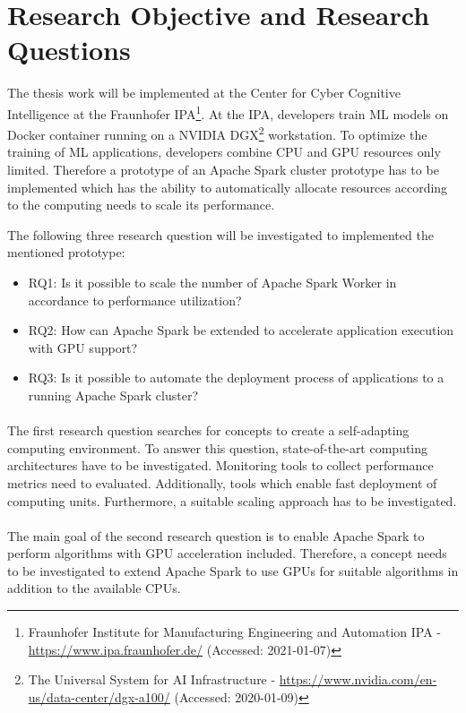 \section{Research Objective and Research Questions}
The thesis work will be implemented at the Center for Cyber Cognitive Intelligence at the Fraunhofer IPA\footnote{Fraunhofer Institute for Manufacturing Engineering and Automation IPA - \url{https://www.ipa.fraunhofer.de/} (Accessed: 2021-01-07)}.
At the IPA, developers train ML models on Docker container running on a NVIDIA DGX\footnote{The Universal System for AI Infrastructure - \url{https://www.nvidia.com/en-us/data-center/dgx-a100/} (Accessed: 2020-01-09)} workstation.
To optimize the training of ML applications, developers combine CPU and GPU resources only limited.
Therefore a prototype of an Apache Spark cluster prototype has to be implemented which has the ability to automatically allocate resources according to the computing needs to scale its performance.


The following three research question will be investigated to implemented the mentioned prototype:
\begin{itemize}
\item RQ1: Is it possible to scale the number of Apache Spark Worker in accordance to performance utilization?
\item RQ2: How can Apache Spark be extended to accelerate application execution with GPU support?
\item RQ3: Is it possible to automate the deployment process of applications to a running Apache Spark cluster?
\end{itemize}


\paragraph{}
The first research question searches for concepts to create a self-adapting computing environment.
To answer this question, state-of-the-art computing architectures have to be investigated.
Monitoring tools to collect performance metrics need to evaluated. Additionally, tools which enable fast deployment of computing units.
Furthermore, a suitable scaling approach has to be investigated.


\paragraph{}
The main goal of the second research question is to enable Apache Spark to perform algorithms with GPU acceleration included.
Therefore, a concept needs to be investigated to extend Apache Spark to use GPUs for suitable algorithms in addition to the available CPUs.


